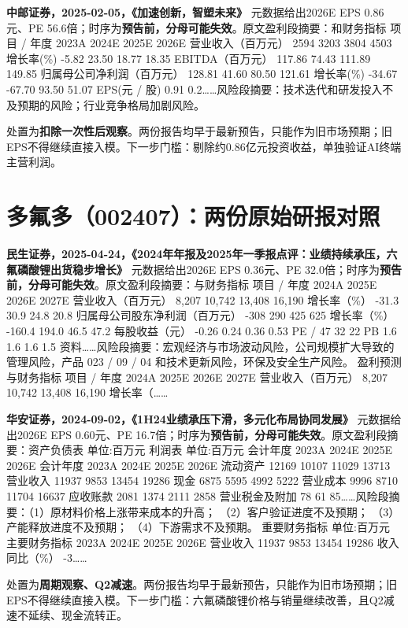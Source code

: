\textbf{中邮证券，2025-02-05，《加速创新，智塑未来》}
元数据给出2026E EPS 0.86元、PE 56.6倍；时序为\textbf{预告前，分母可能失效}。原文盈利段摘要：和财务指标 项目 / 年度 2023A 2024E 2025E 2026E 营业收入（百万元） 2594 3203 3804 4503 增长率(\%) -5.82 23.50 18.77 18.35 EBITDA（百万元） 117.86 74.43 111.89 149.85 归属母公司净利润（百万元） 128.81 41.60 80.50 121.61 增长率(\%) -34.67 -67.70 93.50 51.07 EPS(元 / 股) 0.91 0.2……风险段摘要：技术迭代和研发投入不及预期的风险；行业竞争格局加剧风险。

\begin{keyinsight}[AStock处理]
处置为\textbf{扣除一次性后观察}。两份报告均早于最新预告，只能作为旧市场预期；旧EPS不得继续直接入模。下一步门槛：剔除约0.86亿元投资收益，单独验证AI终端主营利润。
\end{keyinsight}

\section{多氟多（002407）：两份原始研报对照}

\textbf{民生证券，2025-04-24，《2024年年报及2025年一季报点评：业绩持续承压，六氟磷酸锂出货稳步增长》}
元数据给出2026E EPS 0.36元、PE 32.0倍；时序为\textbf{预告前，分母可能失效}。原文盈利段摘要：与财务指标 项目 / 年度 2024A 2025E 2026E 2027E 营业收入（百万元） 8,207 10,742 13,408 16,190 增长率（\%） -31.3 30.9 24.8 20.8 归属母公司股东净利润（百万元） -308 290 425 625 增长率（\%） -160.4 194.0 46.5 47.2 每股收益（元） -0.26 0.24 0.36 0.53 PE / 47 32 22 PB 1.6 1.6 1.6 1.5 资料……风险段摘要：宏观经济与市场波动风险，公司规模扩大导致的管理风险，产品 023 / 09 / 04 和技术更新风险，环保及安全生产风险。 盈利预测与财务指标 项目 / 年度 2024A 2025E 2026E 2027E 营业收入（百万元） 8,207 10,742 13,408 16,190 增长率（……

\textbf{华安证券，2024-09-02，《1H24业绩承压下滑，多元化布局协同发展》}
元数据给出2026E EPS 0.60元、PE 16.7倍；时序为\textbf{预告前，分母可能失效}。原文盈利段摘要：资产负债表 单位:百万元 利润表 单位:百万元 会计年度 2023A 2024E 2025E 2026E 会计年度 2023A 2024E 2025E 2026E 流动资产 12169 10107 11029 13713 营业收入 11937 9853 13454 19286 现金 6875 5595 4992 5222 营业成本 9996 8710 11704 16637 应收账款 2081 1374 2111 2858 营业税金及附加 78 61 85……风险段摘要：（1）原材料价格上涨带来成本的升高； （2）客户验证进度不及预期； （3）产能释放进度不及预期； （4）下游需求不及预期。 重要财务指标 单位:百万元 主要财务指标 2023A 2024E 2025E 2026E 营业收入 11937 9853 13454 19286 收入同比（\%） -3……

\begin{keyinsight}[AStock处理]
处置为\textbf{周期观察、Q2减速}。两份报告均早于最新预告，只能作为旧市场预期；旧EPS不得继续直接入模。下一步门槛：六氟磷酸锂价格与销量继续改善，且Q2减速不延续、现金流转正。
\end{keyinsight}

